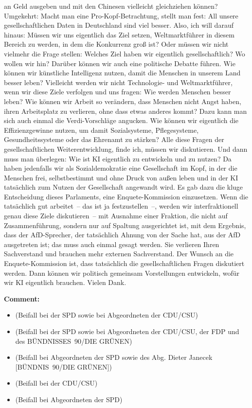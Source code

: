 \documentclass{article}
\begin{document}
an Geld ausgeben und mit den Chinesen vielleicht gleichziehen können? Umgekehrt: Macht man eine Pro-Kopf-Betrachtung, stellt man fest: All unsere gesellschaftlichen Daten in Deutschland sind viel besser. Also, ich will darauf hinaus: Müssen wir uns eigentlich das Ziel setzen, Weltmarktführer in diesem Bereich zu werden, in dem die Konkurrenz groß ist? Oder müssen wir nicht vielmehr die Frage stellen: Welches Ziel haben wir eigentlich gesellschaftlich? Wo wollen wir hin? Darüber können wir auch eine politische Debatte führen.  Wie können wir künstliche Intelligenz nutzen, damit die Menschen in unserem Land besser leben? Vielleicht werden wir nicht Technologie- und Weltmarktführer, wenn wir diese Ziele verfolgen und uns fragen: Wie werden Menschen besser leben? Wie können wir Arbeit so verändern, dass Menschen nicht Angst haben, ihren Arbeitsplatz zu verlieren, ohne dass etwas anderes kommt?  Dazu kann man sich auch einmal die Verdi-Vorschläge angucken. Wie können wir eigentlich die Effizienzgewinne nutzen, um damit Sozialsysteme, Pflegesysteme, Gesundheitssysteme oder das Ehrenamt zu stärken? Alle diese Fragen der gesellschaftlichen Weiterentwicklung, finde ich, müssen wir diskutieren. Und dann muss man überlegen: Wie ist KI eigentlich zu entwickeln und zu nutzen? Da haben jedenfalls wir als Sozialdemokratie eine Gesellschaft im Kopf, in der die Menschen frei, selbstbestimmt und ohne Druck von außen leben und in der KI tatsächlich zum Nutzen der Gesellschaft angewandt wird.  Es gab dazu die kluge Entscheidung dieses Parlaments, eine Enquete-Kommission einzusetzen. Wenn die tatsächlich gut arbeitet – das ist ja festzustellen –, werden wir interfraktionell genau diese Ziele diskutieren – mit Ausnahme einer Fraktion, die nicht auf Zusammenführung, sondern nur auf Spaltung ausgerichtet ist, mit dem Ergebnis, dass der AfD-Sprecher, der tatsächlich Ahnung von der Sache hat, aus der AfD ausgetreten ist; das muss auch einmal gesagt werden.  Sie verlieren Ihren Sachverstand und brauchen mehr externen Sachverstand. Der Wunsch an die Enquete-Kommission ist, dass tatsächlich die gesellschaftlichen Fragen diskutiert werden. Dann können wir politisch gemeinsam Vorstellungen entwickeln, wofür wir KI eigentlich brauchen. Vielen Dank.  

\noindent\textbf{Comment:}
\begin{itemize}
    \setlength\itemsep{-3pt}
    \item (Beifall bei der SPD sowie bei Abgeordneten der CDU/CSU)
    \setlength\itemsep{-3pt}
    \item (Beifall bei der SPD sowie bei Abgeordneten der CDU/CSU, der FDP und des BÜNDNISSES 90/DIE GRÜNEN)
    \setlength\itemsep{-3pt}
    \item (Beifall bei Abgeordneten der SPD sowie des Abg. Dieter Janecek [BÜNDNIS 90/DIE GRÜNEN])
    \setlength\itemsep{-3pt}
    \item (Beifall bei der CDU/CSU)
    \setlength\itemsep{-3pt}
    \item (Beifall bei Abgeordneten der SPD)
\end{itemize}
\end{document}
